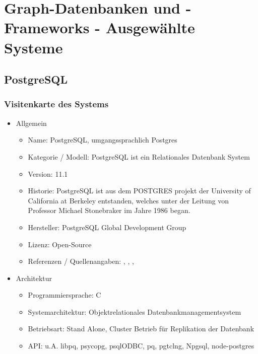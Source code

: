 \chapter{Graph-Datenbanken und -Frameworks - Ausgewählte Systeme }
\section{PostgreSQL}
\subsection{Visitenkarte des Systems}
    \begin{itemize}
        \item Allgemein
        \begin{itemize}
            \item Name: PostgreSQL, umgangssprachlich Postgres
            \item Kategorie / Modell: PostgreSQL ist ein Relationales Datenbank System
            \item Version: 11.1
            \item Historie: PostgreSQL ist aus dem POSTGRES projekt der University of California at Berkeley entstanden, welches unter der Leitung von  Professor Michael Stonebraker im Jahre 1986 began.
            \item Hersteller: PostgreSQL Global Development Group
            \item Lizenz: Open-Source
            \item Referenzen / Quellenangaben: \cite{froehlich01}, \cite{postgres2018}, \cite{postgresqldoc}, \cite{eisentraut01}
        \end{itemize}
        \item Architektur
        \begin{itemize}
            \item Programmiersprache: C
            \item Systemarchitektur: Objektrelationales Datenbankmanagementsystem
            \item Betriebsart: Stand Alone, Cluster Betrieb für Replikation der Datenbank
            \item API: u.A. libpq, psycopg, psqlODBC, pq, pgtclng, Npgsql, node-postgres
        \end{itemize}
        \newpage

\end{itemize}
